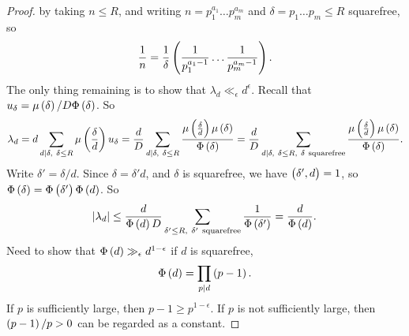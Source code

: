\begin{proof}
by taking $ n \le R $, and writing $ n = p_1^{a_1} \dots p_m^{a_m} $ and $ \delta = p_1 \dots p_m \le R $ squarefree, so
$$ \dfrac{1}{n} = \dfrac{1}{\delta}\br{\dfrac{1}{p_1^{a_1 - 1}} \dots \dfrac{1}{p_m^{a_m - 1}}}. $$
The only thing remaining is to show that $ \lambda_d \ll_\epsilon d^\epsilon $. Recall that $ u_\delta = \mu\br{\delta} / D\Phi\br{\delta} $. So
$$ \lambda_d = d\sum_{d \mid \delta, \ \delta \le R} \mu\br{\dfrac{\delta}{d}}u_\delta = \dfrac{d}{D}\sum_{d \mid \delta, \ \delta \le R} \dfrac{\mu\br{\tfrac{\delta}{d}}\mu\br{\delta}}{\Phi\br{\delta}} = \dfrac{d}{D}\sum_{d \mid \delta, \ \delta \le R, \ \delta \ \text{squarefree}} \dfrac{\mu\br{\tfrac{\delta}{d}}\mu\br{\delta}}{\Phi\br{\delta}}. $$
Write $ \delta' = \delta / d $. Since $ \delta = \delta'd $, and $ \delta $ is squarefree, we have $ \br{\delta', d} = 1 $, so $ \Phi\br{\delta} = \Phi\br{\delta'}\Phi\br{d} $. So
$$ \abs{\lambda_d} \le \dfrac{d}{\Phi\br{d}D}\sum_{\delta' \le R, \ \delta' \ \text{squarefree}} \dfrac{1}{\Phi\br{\delta'}} = \dfrac{d}{\Phi\br{d}}. $$
Need to show that $ \Phi\br{d} \gg_\epsilon d^{1 - \epsilon} $ if $ d $ is squarefree,
$$ \Phi\br{d} = \prod_{p \mid d} \br{p - 1}. $$
If $ p $ is sufficiently large, then $ p - 1 \ge p^{1 - \epsilon} $. If $ p $ is not sufficiently large, then $ \br{p - 1} / p > 0 $ can be regarded as a constant.
\end{proof}

